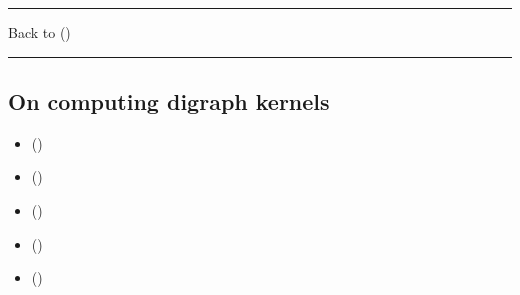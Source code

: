 \documentclass[a4paper,12pt,english]{sphinxhowto}
\begin{document}
\bigskip\hrule\bigskip


\sphinxAtStartPar
Back to {\hyperref[\detokenize{pearls:pearls-label}]{}} ()


\bigskip\hrule\bigskip



\subsection{On computing digraph kernels}
\label{\detokenize{pearls:on-computing-digraph-kernels}}\label{\detokenize{pearls:kernel-tutorial-label}}
\begin{sphinxcontents}
\begin{itemize}
\item {} 
\sphinxAtStartPar
{}\label{\detokenize{pearls:id154}}{\hyperref[\detokenize{pearls:what-is-a-graph-kernel}]{}} ()

\item {} 
\sphinxAtStartPar
{}\label{\detokenize{pearls:id155}}{\hyperref[\detokenize{pearls:initial-and-terminal-kernels}]{}} ()

\item {} 
\sphinxAtStartPar
{}\label{\detokenize{pearls:id156}}{\hyperref[\detokenize{pearls:kernels-in-lateralized-digraphs}]{}} ()

\item {} 
\sphinxAtStartPar
{}\label{\detokenize{pearls:id157}}{\hyperref[\detokenize{pearls:computing-first-and-last-choice-recommendations}]{}} ()

\item {} 
\sphinxAtStartPar
{}\label{\detokenize{pearls:id158}}{\hyperref[\detokenize{pearls:tractability}]{}} ()

\end{itemize}
\end{sphinxcontents}
\end{document}
